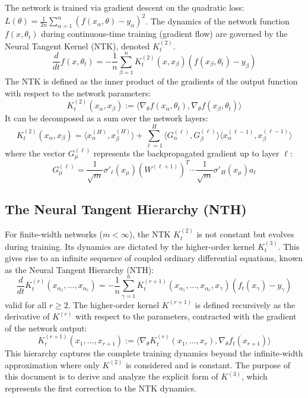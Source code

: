 \documentclass[11pt,a4paper]{article}
\theoremstyle{definition}
\begin{document}
The network is trained via gradient descent on the quadratic loss: $L(\theta) = \frac{1}{2n}\sum_{\alpha=1}^n (f(x_\alpha, \theta) - y_\alpha)^2$. The dynamics of the network function $f(x, \theta_t)$ during continuous-time training (gradient flow) are governed by the Neural Tangent Kernel (NTK), denoted $K^{(2)}_t$.
\begin{equation}
\frac{d}{dt} f(x, \theta_t) = -\frac{1}{n}\sum_{\beta=1}^n K^{(2)}_t(x, x_\beta) (f(x_\beta, \theta_t) - y_\beta)
\end{equation}
The NTK is defined as the inner product of the gradients of the output function with respect to the network parameters:
\begin{equation}
K^{(2)}_t(x_\alpha, x_\beta) := \langle \nabla_\theta f(x_\alpha, \theta_t), \nabla_\theta f(x_\beta, \theta_t) \rangle
\end{equation}
It can be decomposed as a sum over the network layers:
\begin{equation}
K^{(2)}_t(x_\alpha, x_\beta) = \langle x^{(H)}_\alpha, x^{(H)}_\beta \rangle + \sum_{\ell=1}^{H} \langle G^{(\ell)}_\alpha, G^{(\ell)}_\beta \rangle \langle x^{(\ell-1)}_\alpha, x^{(\ell-1)}_\beta \rangle
\end{equation}
where the vector $G^{(\ell)}_\mu$ represents the backpropagated gradient up to layer $\ell$:
\begin{equation}
G^{(\ell)}_\mu = \frac{1}{\sqrt{m}}\sigma'_\ell(x_\mu) (W^{(\ell+1)})^T \cdots \frac{1}{\sqrt{m}}\sigma'_H(x_\mu) a_t
\end{equation}

\subsection{The Neural Tangent Hierarchy (NTH)}
For finite-width networks ($m < \infty$), the NTK $K^{(2)}_t$ is not constant but evolves during training. Its dynamics are dictated by the higher-order kernel $K^{(3)}_t$. This gives rise to an infinite sequence of coupled ordinary differential equations, known as the Neural Tangent Hierarchy (NTH):
\begin{equation}
\frac{d}{dt} K^{(r)}_t(x_{\alpha_1}, \dots, x_{\alpha_r}) = -\frac{1}{n} \sum_{\gamma=1}^n K^{(r+1)}_t(x_{\alpha_1}, \dots, x_{\alpha_r}, x_\gamma) (f_t(x_\gamma) - y_\gamma)
\end{equation}
valid for all $r \ge 2$. The higher-order kernel $K^{(r+1)}$ is defined recursively as the derivative of $K^{(r)}$ with respect to the parameters, contracted with the gradient of the network output:
\begin{equation}
K^{(r+1)}_t(x_1, \dots, x_{r+1}) := \langle \nabla_\theta K^{(r)}_t(x_1, \dots, x_r), \nabla_\theta f_t(x_{r+1}) \rangle
\end{equation}
This hierarchy captures the complete training dynamics beyond the infinite-width approximation where only $K^{(2)}$ is considered and is constant. The purpose of this document is to derive and analyze the explicit form of $K^{(3)}$, which represents the first correction to the NTK dynamics.
\end{document}
